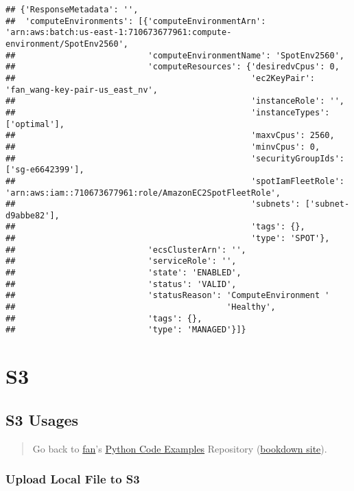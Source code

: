 \documentclass[
]{book}
\begin{document}
\begin{verbatim}
## {'ResponseMetadata': '',
##  'computeEnvironments': [{'computeEnvironmentArn': 'arn:aws:batch:us-east-1:710673677961:compute-environment/SpotEnv2560',
##                           'computeEnvironmentName': 'SpotEnv2560',
##                           'computeResources': {'desiredvCpus': 0,
##                                                'ec2KeyPair': 'fan_wang-key-pair-us_east_nv',
##                                                'instanceRole': '',
##                                                'instanceTypes': ['optimal'],
##                                                'maxvCpus': 2560,
##                                                'minvCpus': 0,
##                                                'securityGroupIds': ['sg-e6642399'],
##                                                'spotIamFleetRole': 'arn:aws:iam::710673677961:role/AmazonEC2SpotFleetRole',
##                                                'subnets': ['subnet-d9abbe82'],
##                                                'tags': {},
##                                                'type': 'SPOT'},
##                           'ecsClusterArn': '',
##                           'serviceRole': '',
##                           'state': 'ENABLED',
##                           'status': 'VALID',
##                           'statusReason': 'ComputeEnvironment '
##                                           'Healthy',
##                           'tags': {},
##                           'type': 'MANAGED'}]}
\end{verbatim}

\hypertarget{s3}{%
\section{S3}\label{s3}}

\hypertarget{s3-usages}{%
\subsection{S3 Usages}\label{s3-usages}}

\begin{quote}
Go back to \href{http://fanwangecon.github.io/}{fan}'s \href{https://fanwangecon.github.io/pyfan/}{Python Code Examples} Repository (\href{https://fanwangecon.github.io/pyfan/bookdown}{bookdown site}).
\end{quote}

\hypertarget{upload-local-file-to-s3}{%
\subsubsection{Upload Local File to S3}\label{upload-local-file-to-s3}}
\end{document}
